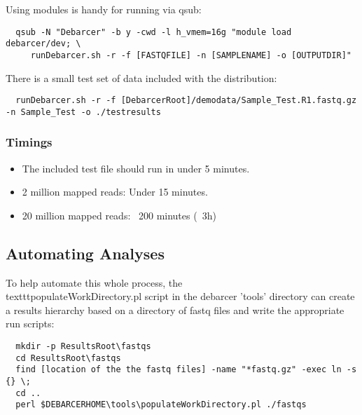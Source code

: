 \documentclass{article}
\begin{document}
Using modules is handy for running via qsub:

\begin{verbatim}
  qsub -N "Debarcer" -b y -cwd -l h_vmem=16g "module load debarcer/dev; \ 
	 runDebarcer.sh -r -f [FASTQFILE] -n [SAMPLENAME] -o [OUTPUTDIR]"
\end{verbatim}

There is a small test set of data included with the distribution:

\begin{verbatim}
  runDebarcer.sh -r -f [DebarcerRoot]/demodata/Sample_Test.R1.fastq.gz -n Sample_Test -o ./testresults
\end{verbatim}

\subsubsection{Timings}

\begin{itemize}
	\item The included test file should run in under 5 minutes.
	\item 2 million mapped reads: Under 15 minutes.
	\item 20 million mapped reads: ~200 minutes (~3h)
\end{itemize}


\subsection{Automating Analyses}

To help automate this whole process, the \\texttt{populateWorkDirectory.pl} script in the 
debarcer 'tools' directory can create a results hierarchy based on a
directory of fastq files and write the appropriate run scripts:

\begin{verbatim}
  mkdir -p ResultsRoot\fastqs
  cd ResultsRoot\fastqs
  find [location of the the fastq files] -name "*fastq.gz" -exec ln -s {} \;
  cd ..
  perl $DEBARCERHOME\tools\populateWorkDirectory.pl ./fastqs
\end{verbatim}
\end{document}
